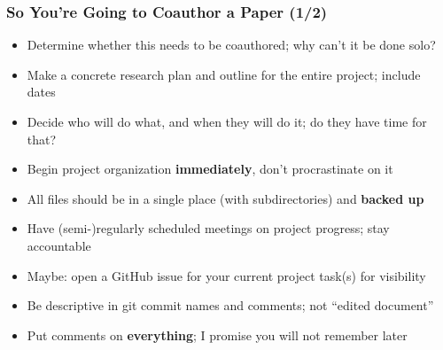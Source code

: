 \documentclass[aspectratio=169]{beamer}
\begin{document}
\begin{frame}
\frametitle{So You're Going to Coauthor a Paper (1/2)}
\begin{itemize}
	\item Determine whether this needs to be coauthored; why can't it be done solo?
	
	\item <2->Make a concrete research plan and outline for the entire project; include dates
	
	\item <2->Decide who will do what, and when they will do it; do they have time for that?
	
	\item <3->Begin project organization \textbf{immediately}, don't procrastinate on it
	
	\item <3->All files should be in a single place (with subdirectories) and \textbf{backed up}
	
	\item <4->Have (semi-)regularly scheduled meetings on project progress; stay accountable
	
	\item <4->Maybe: open a GitHub issue for your current project task(s) for visibility
	
	\item <5->Be descriptive in git commit names and comments; not ``edited document''
	
	\item <5->Put comments on \textbf{everything}; I promise you will not remember later
\end{itemize}
\end{frame}
\end{document}
